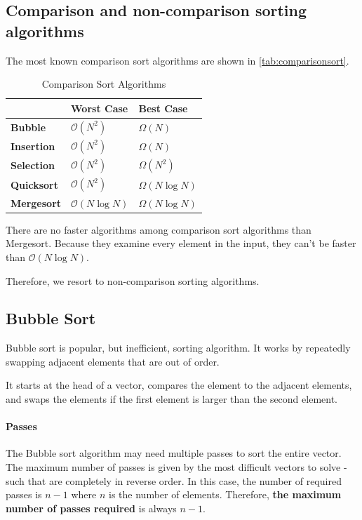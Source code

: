 \subsection{Comparison and non-comparison sorting algorithms}

The most known comparison sort algorithms are shown in \autoref{tab:comparisonsort}.

\begin{table}[H]
    \centering
    \caption{Comparison Sort Algorithms}
    \label{tab:comparisonsort}
    \begin{tabular}[width=10cm]{lll}
        \hline
                           & \textbf{Worst Case}     & \textbf{Best Case} \\ \hline
        \textbf{Bubble}    & $\mathcal{O}(N^2)$      & $\Omega(N)$        \\
        \textbf{Insertion} & $\mathcal{O}(N^2)$      & $\Omega(N)$        \\
        \textbf{Selection} & $\mathcal{O}(N^2)$      & $\Omega(N^2)$      \\
        \textbf{Quicksort} & $\mathcal{O}(N^2)$      & $\Omega(N \log N)$ \\
        \textbf{Mergesort} & $\mathcal{O}(N \log N)$ & $\Omega(N \log N)$
    \end{tabular}
\end{table}

There are no faster algorithms among comparison sort algorithms than Mergesort. Because they examine every element in the input, they can't be faster than $\mathcal{O}(N \log N)$.

Therefore, we resort to non-comparison sorting algorithms.

\subsection{Bubble Sort}
Bubble sort is popular, but inefficient, sorting algorithm. It works by repeatedly swapping adjacent elements that are out of order.

It starts at the head of a vector, compares the element to the adjacent elements, and swaps the elements if the first element is larger than the second element.

\paragraph{Passes} The Bubble sort algorithm may need multiple passes to sort the entire vector. The maximum number of passes is given by the most difficult vectors to solve - such that are completely in reverse order. In this case, the number of required passes is \( n-1 \) where \( n \) is the number of elements. Therefore, \textbf{the maximum number of passes required} is always \( n-1 \).  

